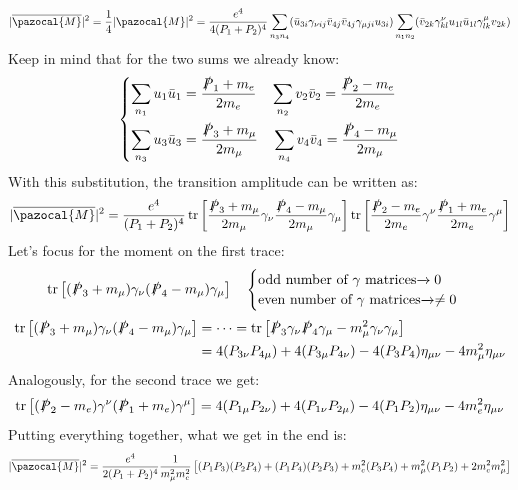 \documentclass[../main.tex]{subfiles}
\begin{document}
\[
|\overline{\pazocal{M}}|^2=\frac{1}{4}|\pazocal{M}|^2=\frac{e^4}{4(P_1+P_2)^4}\sum_{n_3n_4}(\bar{u}_{3i}\gamma_{\nu ij}\bar{v}_{4j}\bar{v}_{4j}\gamma_{\mu ji}u_{3i})\sum_{n_1n_2}(\bar{v}_{2k}\gamma^\nu_{kl}u_{1l}\bar{u}_{1l}\gamma^\mu_{lk}v_{2k})
\]
Keep in mind that for the two sums we already know:
\[
\left\{
\begin{aligned}
\sum_{n_1}u_1\bar{u}_1&=\frac{\slashed{P}_1+m_e}{2m_e} \quad \sum_{n_2}v_2\bar{v}_2=\frac{\slashed{P}_2-m_e}{2m_e}\\
\sum_{n_3}u_3\bar{u}_3&=\frac{\slashed{P}_3+m_\mu}{2m_\mu} \quad \sum_{n_4}v_4\bar{v}_4=\frac{\slashed{P}_4-m_\mu}{2m_\mu}
\end{aligned}
\right.
\]
With this substitution, the transition amplitude can be written as:
\[
|\overline{\pazocal{M}}|^2=\frac{e^4}{(P_1+P_2)^4}\tr\left[\frac{\slashed{P}_3+m_\mu}{2m_\mu}\gamma_\nu\frac{\slashed{P}_4-m_\mu}{2m_\mu}\gamma_\mu\right]\tr\left[\frac{\slashed{P}_2-m_e}{2m_e}\gamma^\nu\frac{\slashed{P}_1+m_e}{2m_e}\gamma^\mu\right]
\]
Let's focus for the moment on the first trace:
\[
\tr\left[(\slashed{P}_3+m_\mu)\gamma_\nu(\slashed{P}_4-m_\mu)\gamma_\mu\right]
\quad
\begin{cases}
\text{odd number of $\gamma$ matrices$\xrightarrow[]{}0$}\\
\text{even number of $\gamma$ matrices$\xrightarrow[]{}\neq0$}
\end{cases}
\]
\begin{align*}
\tr\left[(\slashed{P}_3+m_\mu)\gamma_\nu(\slashed{P}_4-m_\mu)\gamma_\mu\right]&=\dots=\tr\left[\slashed{P}_3\gamma_\nu\slashed{P}_4\gamma_\mu-m_\mu^2\gamma_\nu\gamma_\mu\right]\\
&=4(P_{3\nu}P_{4\mu})+4(P_{3\mu}P_{4\nu})-4(P_3P_4)\eta_{\mu\nu}-4m_\mu^2\eta_{\mu\nu}
\end{align*}
Analogously, for the second trace we get:
\[
\tr\left[(\slashed{P}_2-m_e)\gamma^\nu(\slashed{P}_1+m_e)\gamma^\mu\right]=4(P_{1\mu}P_{2\nu})+4(P_{1\nu}P_{2\mu})-4(P_1P_2)\eta_{\mu\nu}-4m_e^2\eta_{\mu\nu}
\]
Putting everything together, what we get in the end is:
\[
|\overline{\pazocal{M}}|^2=\frac{e^4}{2(P_1+P_2)^4}\frac{1}{m_\mu^2m_e^2}\left[(P_1P_3)(P_2P_4)+(P_1P_4)(P_2P_3)+m_e^2(P_3P_4)+m_\mu^2(P_1P_2)+2m_e^2m_\mu^2\right]
\]
\end{document}
